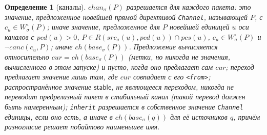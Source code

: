 \documentclass[sigconf,nonacm]{acmart}
\theoremstyle{acmplain}
\theoremstyle{acmdefinition}
\newtheorem{definition}[theorem]{Определение}
\theoremstyle{acmplain}
\newcommand{\code}[1]{\texttt{#1}}
\begin{document}
\begin{definition}[каналы]
\label{def:chan}
$\mathit{chan}_\sigma(P)$ разрешается для \emph{каждого} пакета: это значение,
предложенное новейшей прямой директивой \code{Channel}, называющей $P$, с
$c_u \in W^\circ_\sigma(P)$; иначе значение, предложенное для $P$ новейшей
единицей $u$ оси каналов с $\mathit{pcd}(u) > 0$, $P \in
R(\mathit{src}_\sigma(u), \mathit{pcd}(u)) \cap \mathit{pcs}(u)$,
$c_u \in W^\circ_\sigma(P)$ и $\lnot\mathit{canc}(c_u,P)$; иначе
$\mathit{ch}(\mathit{base}_\sigma(P))$. Предложение вычисляется относительно
$\mathit{cur} = \mathit{ch}(\mathit{base}_\sigma(P))$ (метки, но никогда не
значения, вычисленного в этом запуске) и пусто, когда оно предлагает
сам $\mathit{cur}$; переход предлагает значение лишь там, где $\mathit{cur}$
совпадает с его \code{<from>}; \emph{распространённое} значение $\mathsf{stable}$,
не являющееся переходом, никогда не переводит предрелизный пакет в стабильный канал (такой
перевод должен быть намеренным); \code{inherit} разрешается в собственное
значение \code{Channel} единицы, если оно есть, а иначе в
$\mathit{ch}(\mathit{base}_\sigma(q))$ для её источников $q$, причём разногласие
решает побайтово наименьшее имя.
\end{definition}
\end{document}
